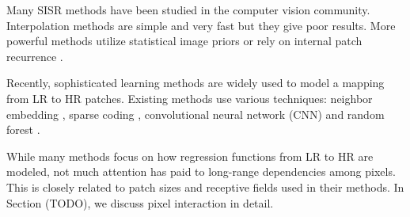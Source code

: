 \documentclass[10pt,twocolumn,letterpaper]{article}
\begin{document}
Many SISR methods have been studied in the computer vision community. Interpolation methods are simple and very fast but they give poor results. More powerful methods utilize statistical image priors \cite{sun2008image,Kim2010} or rely on internal patch recurrence \cite{glasner2009super, Huang-CVPR-2015}.

Recently, sophisticated learning methods are widely used to model a mapping from LR to HR patches. Existing methods use various techniques: neighbor embedding \cite{chang2004super,bevilacqua2012}, sparse coding \cite{yang2010image,zeyde2012single,Timofte2013,Timofte}, convolutional neural network (CNN) \cite{Dong2014} and random forest \cite{schulter2015fast}.

While many methods focus on how regression functions from LR to HR are modeled, not much attention has paid to long-range dependencies among pixels. This is closely related to patch sizes and receptive fields used in their methods. In Section (TODO), we discuss pixel interaction in detail.




%
%
%
%
%
\end{document}
